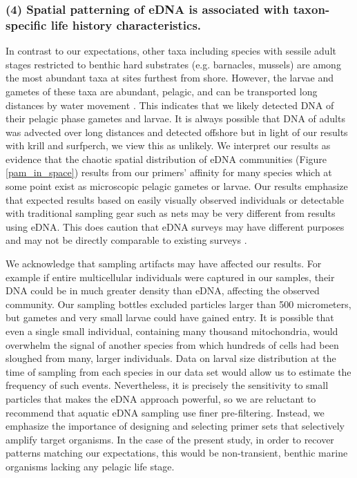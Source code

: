 \documentclass[11pt,letterpaper]{article} %
\begin{document}
\subsubsection*{(4) Spatial patterning of eDNA is associated with taxon-specific life history characteristics.}
In contrast to our expectations, other taxa including species with sessile adult stages restricted to benthic hard substrates (e.g. barnacles, mussels) are among the most abundant taxa at sites furthest from shore. However, the larvae and gametes of these taxa are abundant, pelagic, and can be transported long distances by water movement \citep{Strathmann1987}. This indicates that we likely detected DNA of their pelagic phase gametes and larvae. It is always possible that DNA of adults was advected over long distances and detected offshore but in light of our results with krill and surfperch, we view this as unlikely. We interpret our results as evidence that the chaotic spatial distribution of eDNA communities (Figure \ref{pam_in_space}) results from our primers' affinity for many species which at some point exist as microscopic pelagic gametes or larvae. Our results emphasize that expected results based on easily visually observed individuals or detectable with traditional sampling gear such as nets may be very different from results using eDNA. This does caution that eDNA surveys may have different purposes and may not be directly comparable to existing surveys \citep{Shelton2016}.


We acknowledge that sampling artifacts may have affected our results. For example if entire multicellular individuals were captured in our samples, their DNA could be in much greater density than eDNA, affecting the observed community. Our sampling bottles excluded particles larger than 500 micrometers, but gametes and very small larvae could have gained entry. It is possible that even a single small individual, containing many thousand mitochondria, would overwhelm the signal of another species from which hundreds of cells had been sloughed from many, larger individuals. Data on larval size distribution at the time of sampling from each species in our data set would allow us to estimate the frequency of such events. Nevertheless, it is precisely the sensitivity to small particles that makes the eDNA approach powerful, so we are reluctant to recommend that aquatic eDNA sampling use finer pre-filtering. Instead, we emphasize the importance of designing and selecting primer sets that selectively amplify target organisms. In the case of the present study, in order to recover patterns matching our expectations, this would be non-transient, benthic marine organisms lacking any pelagic life stage.
\end{document}
